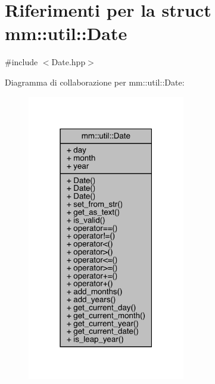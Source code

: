 \hypertarget{structmm_1_1util_1_1_date}{}\section{Riferimenti per la struct mm\+:\+:util\+:\+:Date}
\label{structmm_1_1util_1_1_date}


{\ttfamily \#include $<$Date.\+hpp$>$}



Diagramma di collaborazione per mm\+:\+:util\+:\+:Date\+:
\nopagebreak
\begin{figure}[H]
\begin{center}
\leavevmode
\includegraphics[width=195pt]{d4/d70/structmm_1_1util_1_1_date__coll__graph}
\end{center}
\end{figure}
